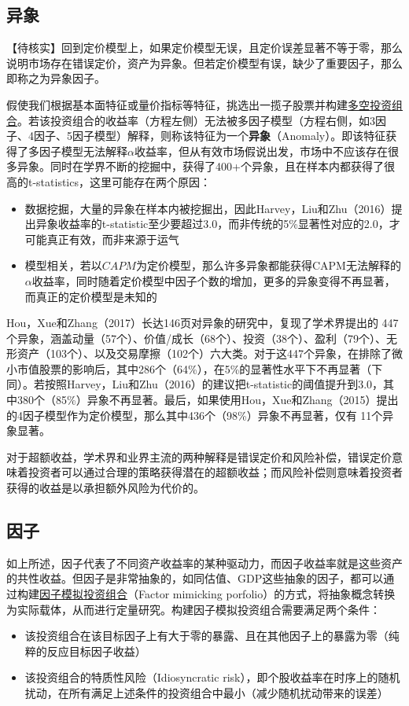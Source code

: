\documentclass[11pt]{article}
\begin{document}
\subsection{异象}

【待核实】回到定价模型上，如果定价模型无误，且定价误差显著不等于零，那么说明市场存在错误定价，资产为异象。但若定价模型有误，缺少了重要因子，那么即称之为异象因子。

假使我们根据基本面特征或量价指标等特征，挑选出一揽子股票并构建\uline{多空投资组合}。若该投资组合的收益率（方程左侧）无法被多因子模型（方程右侧，如3因子、4因子、5因子模型）解释，则称该特征为一个\textbf{异象}（Anomaly）。即该特征获得了多因子模型无法解释$\alpha$收益率，但从有效市场假说出发，市场中不应该存在很多异象。同时在学界不断的挖掘中，获得了400+个异象，且在样本内都获得了很高的t-statistics，这里可能存在两个原因：
\begin{itemize}
    \item 数据挖掘，大量的异象在样本内被挖掘出，因此Harvey，Liu和Zhu（2016）提出异象收益率的t-statistic至少要超过3.0，而非传统的5\%显著性对应的2.0，才可能真正有效，而非来源于运气
    \item 模型相关，若以$CAPM$为定价模型，那么许多异象都能获得CAPM无法解释的$\alpha$收益率，同时随着定价模型中因子个数的增加，更多的异象变得不再显著，而真正的定价模型是未知的
\end{itemize}

Hou，Xue和Zhang（2017）长达146页对异象的研究中，复现了学术界提出的 447 个异象，涵盖动量（57个）、价值/成长（68个）、投资（38个）、盈利（79个）、无形资产（103个）、以及交易摩擦（102个）六大类。对于这447个异象，在排除了微小市值股票的影响后，其中286个（64\%），在5\%的显著性水平下不再显著（下同）。若按照Harvey，Liu和Zhu（2016）的建议把t-statistic的阈值提升到3.0，其中380个（85\%）异象不再显著。最后，如果使用Hou，Xue和Zhang（2015）提出的4因子模型作为定价模型，那么其中436个（98\%）异象不再显著，仅有 11个异象显著。

对于超额收益，学术界和业界主流的两种解释是错误定价和风险补偿，错误定价意味着投资者可以通过合理的策略获得潜在的超额收益；而风险补偿则意味着投资者获得的收益是以承担额外风险为代价的。

\subsection{因子}

如上所述，因子代表了不同资产收益率的某种驱动力，而因子收益率就是这些资产的共性收益。但因子是非常抽象的，如同估值、GDP这些抽象的因子，都可以通过构建\uline{因子模拟投资组合}（Factor mimicking porfolio）的方式，将抽象概念转换为实际载体，从而进行定量研究。构建因子模拟投资组合需要满足两个条件：
\begin{itemize}
    \item 该投资组合在该目标因子上有大于零的暴露、且在其他因子上的暴露为零（纯粹的反应目标因子收益）
    \item 该投资组合的特质性风险（Idiosyncratic risk），即个股收益率在时序上的随机扰动，在所有满足上述条件的投资组合中最小（减少随机扰动带来的误差）
\end{itemize}
\end{document}
